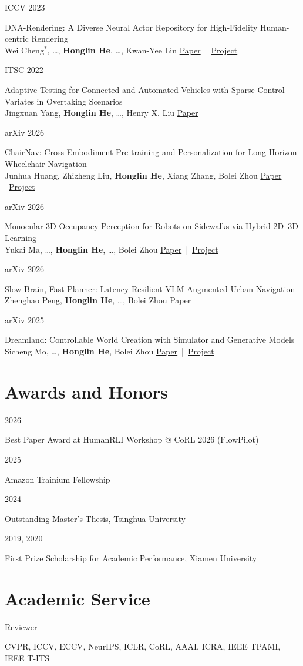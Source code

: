 \documentclass[letterpaper,10pt]{article}
\newlength{\gutter}\setlength{\gutter}{1.02in}
\newlength{\gutgap}\setlength{\gutgap}{0.14in}
\newlength{\bodycol}\setlength{\bodycol}{\textwidth-\gutter-\gutgap}
\newcommand{\entry}[2]{%
  \par\vspace{2pt}%
  \parbox[t]{\gutter}{\strut\small\color{keycol}\raggedright#1}%
  \hspace{\gutgap}%
  \parbox[t]{\bodycol}{\strut\raggedright#2}%
  \par}
\newcommand{\me}{\textbf{Honglin He}}
\newcommand{\links}[1]{\mbox{\small #1}}
\begin{document}
\entry{ICCV 2023}{\small%
  DNA-Rendering: A Diverse Neural Actor Repository for High-Fidelity Human-centric Rendering\\
  Wei Cheng$^{*}$, \ldots, \me, \ldots, Kwan-Yee Lin
  \quad \links{\href{https://arxiv.org/abs/2307.10173}{Paper} | \href{https://dna-rendering.github.io/}{Project}}}

\entry{ITSC 2022}{\small%
  Adaptive Testing for Connected and Automated Vehicles with Sparse Control Variates in Overtaking Scenarios\\
  Jingxuan Yang, \me, \ldots, Henry X. Liu
  \quad \links{\href{https://ieeexplore.ieee.org/document/9922583}{Paper}}}

\entry{arXiv 2026}{\small%
  ChairNav: Cross-Embodiment Pre-training and Personalization for Long-Horizon Wheelchair Navigation\\
  Junhua Huang, Zhizheng Liu, \me, Xiang Zhang, Bolei Zhou
  \quad \links{\href{https://arxiv.org/abs/2610.24012}{Paper} | \href{https://vail.cs.ucla.edu/ChairNav/}{Project}}}

\entry{arXiv 2026}{\small%
  Monocular 3D Occupancy Perception for Robots on Sidewalks via Hybrid 2D--3D Learning\\
  Yukai Ma, \ldots, \me, \ldots, Bolei Zhou
  \quad \links{\href{https://arxiv.org/abs/2606.19122}{Paper} | \href{https://vail-ucla.github.io/walkocc/}{Project}}}

\entry{arXiv 2026}{\small%
  Slow Brain, Fast Planner: Latency-Resilient VLM-Augmented Urban Navigation\\
  Zhenghao Peng, \me, \ldots, Bolei Zhou
  \quad \links{\href{https://arxiv.org/abs/2606.20458}{Paper}}}

\entry{arXiv 2025}{\small%
  Dreamland: Controllable World Creation with Simulator and Generative Models\\
  Sicheng Mo, \ldots, \me, Bolei Zhou
  \quad \links{\href{https://arxiv.org/abs/2506.08006}{Paper} | \href{https://metadriverse.github.io/dreamland/}{Project}}}

\section{Awards and Honors}

\entry{2026}{Best Paper Award at HumanRLI Workshop @ CoRL 2026 (FlowPilot)}
\entry{2025}{Amazon Trainium Fellowship}
\entry{2024}{Outstanding Master's Thesis, Tsinghua University}
\entry{2019, 2020}{First Prize Scholarship for Academic Performance, Xiamen University}

\section{Academic Service}

\entry{Reviewer}{CVPR, ICCV, ECCV, NeurIPS, ICLR, CoRL, AAAI, ICRA, IEEE TPAMI, IEEE T-ITS}

\end{document}
